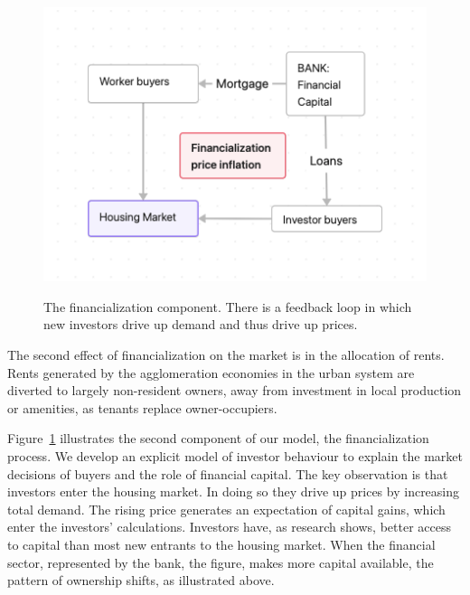 \begin{figure}[!ht]
    \centering
    \includegraphics[scale=.70]{fig/flow_financialization.png}
    \label{fig-financial-cycle}
    \caption[The financialization component of the model.]{The financialization component. There is a feedback loop in which new investors drive up demand and thus drive up prices.}
\end{figure}

The second effect of financialization on the market is in the allocation of rents. Rents generated by the agglomeration economies in the urban system are diverted to largely non-resident owners, away from investment in local production or amenities, as tenants replace owner-occupiers. %

Figure~\ref{fig-financial-cycle} illustrates the second component of our model, the financialization process. We develop an explicit model of investor behaviour to explain the market decisions of buyers and the role of financial capital. 
The key observation is that investors enter the housing market. In doing so they drive up prices by increasing total demand. The rising price generates an expectation of capital gains, which enter the investors' calculations. Investors have, as research shows, better access to capital than most new entrants to the housing market. When the financial sector, represented by the bank, the figure, %
makes more capital available, the pattern of ownership shifts, as illustrated above. %

